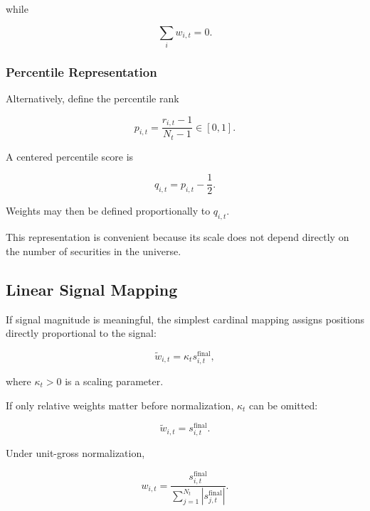 \documentclass[11pt,a4paper]{article}
\begin{document}
while

\begin{equation}
\sum_i w_{i,t}=0.
\end{equation}


\subsubsection{Percentile Representation}

Alternatively, define the percentile rank

\begin{equation}
p_{i,t}
=
\frac{
r_{i,t}-1
}{
N_t-1
}
\in[0,1].
\end{equation}

A centered percentile score is

\begin{equation}
\boxed{
q_{i,t}
=
p_{i,t}
-
\frac{1}{2}.
}
\end{equation}

Weights may then be defined proportionally to $q_{i,t}$.

This representation is convenient because its scale does not depend directly
on the number of securities in the universe.


\subsection{Linear Signal Mapping}
\label{subsec:linear_signal_mapping}

If signal magnitude is meaningful, the simplest cardinal mapping assigns
positions directly proportional to the signal:

\begin{equation}
\boxed{
\widetilde{w}_{i,t}
=
\kappa_t
s_{i,t}^{\mathrm{final}},
}
\end{equation}

where $\kappa_t>0$ is a scaling parameter.

If only relative weights matter before normalization, $\kappa_t$ can be omitted:

\begin{equation}
\widetilde{w}_{i,t}
=
s_{i,t}^{\mathrm{final}}.
\end{equation}

Under unit-gross normalization,

\begin{equation}
\boxed{
w_{i,t}
=
\frac{
s_{i,t}^{\mathrm{final}}
}{
\sum_{j=1}^{N_t}
|s_{j,t}^{\mathrm{final}}|
}.
}
\end{equation}
\end{document}
